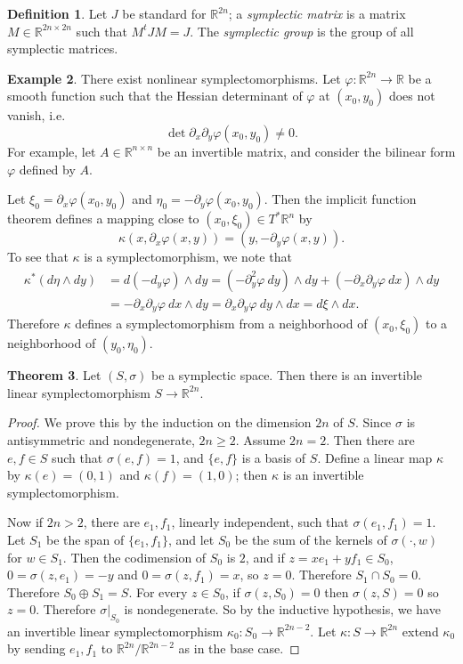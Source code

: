\documentclass[12pt]{report}
\newcommand{\RR}{\mathbb{R}}
\newcommand{\dfn}[1]{\emph{#1}\index{#1}}
\theoremstyle{definition}
\newtheorem{theorem}{Theorem}[chapter]
\newtheorem{definition}[theorem]{Definition}
\newtheorem{example}[theorem]{Example}
\begin{document}
\begin{definition}
Let $J$ be standard for $\RR^{2n}$; a \dfn{symplectic matrix} is a matrix $M \in \RR^{2n \times 2n}$ such that $M^tJM = J$. The \dfn{symplectic group} is the group of all symplectic matrices.
\end{definition}
\begin{example}
There exist nonlinear symplectomorphisms. Let $\varphi: \RR^{2n} \to \RR$ be a smooth function such that the Hessian determinant of $\varphi$ at $(x_0, y_0)$ does not vanish, i.e.
$$\det \partial_x \partial_y \varphi(x_0, y_0) \neq 0.$$
For example, let $A \in \RR^{n \times n}$ be an invertible matrix, and consider the bilinear form $\varphi$ defined by $A$.

Let $\xi_0 = \partial_x\varphi(x_0, y_0)$ and $\eta_0 = -\partial_y\varphi(x_0, y_0)$. Then the implicit function theorem defines a mapping close to $(x_0, \xi_0) \in T^*\RR^n$ by
$$\kappa(x, \partial_x\varphi(x, y)) = (y, -\partial_y\varphi(x, y)).$$
To see that $\kappa$ is a symplectomorphism, we note that
\begin{align*}
  \kappa^*(d\eta \wedge dy) &= d(-d_y\varphi) \wedge dy = (-\partial_y^2\varphi~dy) \wedge dy + (-\partial_x\partial_y\varphi~dx) \wedge dy\\
    &= -\partial_x\partial_y \varphi~dx\wedge dy = \partial_x\partial_y\varphi~dy\wedge dx = d\xi \wedge dx.
\end{align*}
Therefore $\kappa$ defines a symplectomorphism from a neighborhood of $(x_0, \xi_0)$ to a neighborhood of $(y_0, \eta_0)$.
\end{example}
\begin{theorem}
Let $(S, \sigma)$ be a symplectic space. Then there is an invertible linear symplectomorphism $S \to \RR^{2n}$.
\end{theorem}
\begin{proof}
We prove this by the induction on the dimension $2n$ of $S$. Since $\sigma$ is antisymmetric and nondegenerate, $2n \geq 2$. Assume $2n = 2$. Then there are $e,f \in S$ such that $\sigma(e, f) = 1$, and $\{e, f\}$ is a basis of $S$. Define a linear map $\kappa$ by $\kappa(e) = (0, 1)$ and $\kappa(f) = (1, 0)$; then $\kappa$ is an invertible symplectomorphism.

Now if $2n > 2$, there are $e_1,f_1$, linearly independent, such that $\sigma(e_1, f_1) = 1$. Let $S_1$ be the span of $\{e_1, f_1\}$, and let $S_0$ be the sum of the kernels of $\sigma(\cdot, w)$ for $w \in S_1$.
Then the codimension of $S_0$ is $2$, and if $z = xe_1 + yf_1 \in S_0$, $0 = \sigma(z, e_1) = -y$ and $0 = \sigma(z, f_1) = x$, so $z = 0$. Therefore $S_1 \cap S_0 = 0$.
Therefore $S_0 \oplus S_1 = S$.
For every $z \in S_0$, if $\sigma(z, S_0) = 0$ then $\sigma(z, S) = 0$ so $z = 0$. Therefore $\sigma|_{S_0}$ is nondegenerate.
So by the inductive hypothesis, we have an invertible linear symplectomorphism $\kappa_0: S_0 \to \RR^{2n - 2}$. Let $\kappa: S \to \RR^{2n}$ extend $\kappa_0$ by sending $e_1, f_1$ to $\RR^{2n}/\RR^{2n-2}$ as in the base case.
\end{proof}
\end{document}
